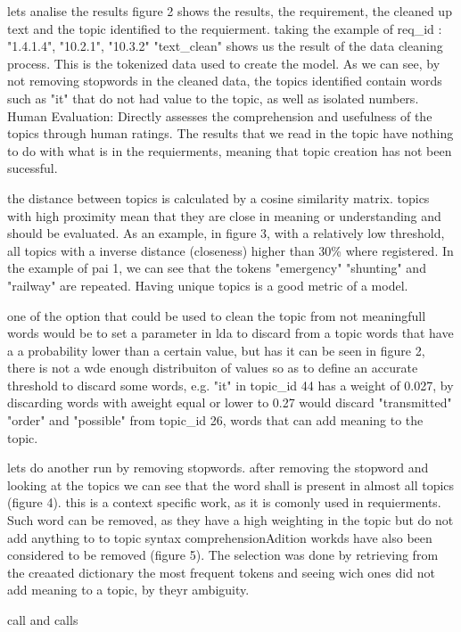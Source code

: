 lets analise the results
figure 2 shows the results, the requirement, the cleaned up text and the topic identified to the requierment.
taking the example of req_id : "1.4.1.4", "10.2.1", "10.3.2"
"text_clean" shows us the result of the data cleaning process. This is the tokenized data used to create the model. 
As we can see, by not removing stopwords in the cleaned data, the topics identified contain words such as "it" that do not had value to the topic, as well as isolated numbers.
Human Evaluation: Directly assesses the comprehension and usefulness of the topics through human ratings.
The results that we read in the topic have nothing to do with what is in the requierments, meaning that topic creation has not been sucessful.


the distance between topics is calculated by a cosine similarity matrix. topics with high proximity mean that they are close in meaning or understanding and should be evaluated. As an example, in figure 3, with a relatively low threshold, all topics with a inverse distance (closeness) higher than 30\% where registered. In the example of pai 1, we can see that the tokens "emergency" "shunting" and "railway" are repeated.
Having unique topics is a good metric of a model.


one of the option that could be used to clean the topic from not meaningfull words would be to set a parameter in lda to discard from a topic words that have a a probability lower than a certain value, but has it can be seen in figure 2, there is not a wde enough distribuiton of values so as to define an accurate threshold to discard some words, e.g. "it" in topic_id 44 has a weight of 0.027, by discarding words with aweight equal or lower to 0.27 would discard "transmitted" "order" and "possible" from topic_id 26, words that can add meaning to the topic. 

lets do another run by removing stopwords.
after removing the stopword and looking at the topics we can see that the word shall is present in almost all topics (figure 4). this is a context specific work, as it is comonly used in requierments.
Such word can be removed, as they have a high weighting in the topic but do not add anything to to topic syntax comprehensionAdition workds have also been considered to be removed (figure 5). The selection was done by retrieving from the creaated dictionary the most frequent tokens and seeing wich ones did not add meaning to a topic, by theyr ambiguity. 


call and calls






